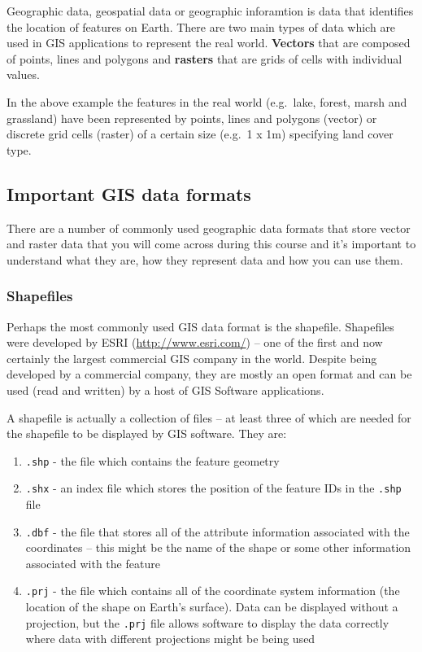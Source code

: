 \documentclass[]{book}
\providecommand{\tightlist}{%
  \setlength{\itemsep}{0pt}\setlength{\parskip}{0pt}}
\begin{document}
Geographic data, geospatial data or geographic inforamtion is data that identifies the location of features on Earth. There are two main types of data which are used in GIS applications to represent the real world. \textbf{Vectors} that are composed of points, lines and polygons and \textbf{rasters} that are grids of cells with individual values.

In the above example the features in the real world (e.g.~lake, forest, marsh and grassland) have been represented by points, lines and polygons (vector) or discrete grid cells (raster) of a certain size (e.g.~1 x 1m) specifying land cover type.

\hypertarget{important-gis-data-formats}{%
\subsection{Important GIS data formats}\label{important-gis-data-formats}}

There are a number of commonly used geographic data formats that store vector and raster data that you will come across during this course and it's important to understand what they are, how they represent data and how you can use them.

\hypertarget{shapefiles}{%
\subsubsection{Shapefiles}\label{shapefiles}}

Perhaps the most commonly used GIS data format is the shapefile. Shapefiles were developed by ESRI (\url{http://www.esri.com/}) -- one of the first and now certainly the largest commercial GIS company in the world. Despite being developed by a commercial company, they are mostly an open format and can be used (read and written) by a host of GIS Software applications.

A shapefile is actually a collection of files -- at least three of which are needed for the shapefile to be displayed by GIS software. They are:

\begin{enumerate}
\def\labelenumi{\arabic{enumi}.}
\tightlist
\item
  \texttt{.shp} - the file which contains the feature geometry
\item
  \texttt{.shx} - an index file which stores the position of the feature IDs in the \texttt{.shp} file
\item
  \texttt{.dbf} - the file that stores all of the attribute information associated with the coordinates -- this might be the name of the shape or some other information associated with the feature
\item
  \texttt{.prj} - the file which contains all of the coordinate system information (the location of the shape on Earth's surface). Data can be displayed without a projection, but the \texttt{.prj} file allows software to display the data correctly where data with different projections might be being used
\end{enumerate}
\end{document}
